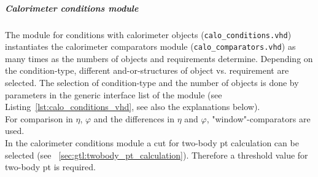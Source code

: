 \subparagraph{Calorimeter conditions module}\label{sec:gtl:calo_conditions_module}

The module for conditions with calorimeter objects (\texttt{calo\_conditions.vhd}) instantiates the calorimeter comparators module (\texttt{calo\_comparators.vhd}) as many times as
the numbers of objects and requirements determine. Depending on the condition-type, different and-or-structures of object vs. requirement are selected.
The selection of condition-type and the number of objects is done by parameters in the generic interface list of the module (see Listing~\ref{lst:calo_conditions_vhd},
see also the explanations below).\\
For comparison in $\eta$, $\varphi$ and the differences in $\eta$ and $\varphi$, "window"-comparators are used.\\
In the calorimeter conditions module a cut for two-body pt calculation can be selected (see ~\ref{sec:gtl:twobody_pt_calculation}). Therefore a threshold value for two-body pt is required.\\



